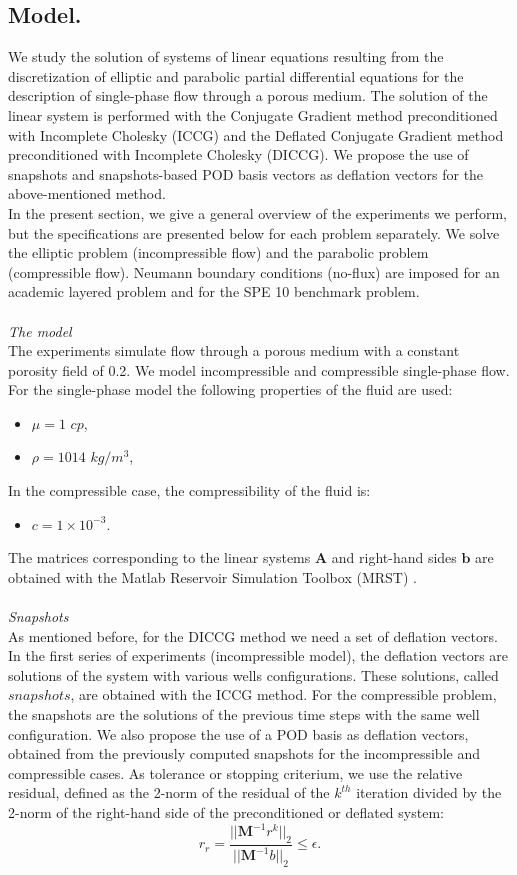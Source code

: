 \documentclass[review]{elsarticle}
\begin{document}
\subsection{Model.}\label{modpro}
\hspace{0.5cm} We study the solution of systems of linear equations resulting from the discretization of elliptic and parabolic partial differential equations for the description of single-phase flow through a porous medium. 
The solution of the linear system is performed with the Conjugate Gradient method preconditioned with Incomplete Cholesky (ICCG) and the Deflated Conjugate Gradient method preconditioned with Incomplete Cholesky (DICCG).
We propose the use of snapshots and snapshots-based POD basis vectors as deflation vectors for the above-mentioned method.\\
In the present section, we give a general overview of the experiments we perform, but the specifications
 are presented below for each problem separately. We solve the elliptic problem (incompressible flow) and the parabolic problem (compressible flow). Neumann boundary conditions (no-flux) are imposed for an academic layered problem and for the SPE 10 benchmark problem.
\\ \\
\emph{The model}\\
The experiments simulate flow through a porous medium with a constant porosity field of 0.2.
We model incompressible and compressible single-phase flow.
For the single-phase model the following properties of the fluid are used:
\begin{itemize}
 \item $\mu = 1$ $cp$,
 \item $\rho = 1014$ $kg/m^3$,
\end{itemize}
In the compressible case, the compressibility of the fluid is:
\begin{itemize}
 \item $c= 1 \times 10^{-3}$.
\end{itemize}
The matrices corresponding to the linear systems $\mathbf{A}$ and right-hand sides $\mathbf{b}$ are obtained with the Matlab Reservoir Simulation Toolbox (MRST) \cite{Lie13}.
\\ \\
\emph{Snapshots}\\
As mentioned before, for the DICCG method we need a set of deflation vectors. In the first series of
experiments (incompressible model), the deflation vectors are 
solutions of the system with various wells configurations. These solutions, 
called $snapshots$, are obtained with the ICCG method. 
For the compressible problem, the snapshots are the solutions of the previous time steps with the same well configuration. 
We also propose the use of a POD basis as deflation vectors, obtained from the previously computed snapshots for the incompressible and compressible cases.
As tolerance or stopping criterium, we use the relative residual, defined as the 2-norm of the residual of the $k^{th}$ iteration divided by 
the 2-norm of the right-hand side of the preconditioned or deflated system: 
$$r_r=\frac{||\mathbf{M}^{-1}r^k||_2}{||\mathbf{M}^{-1}b||_2}\leq \epsilon.$$
\end{document}
